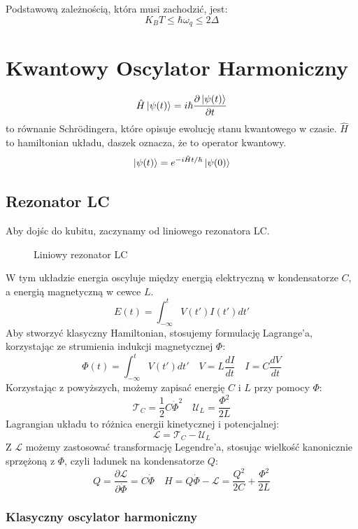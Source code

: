 \documentclass{../notatki}
\begin{document}
Podstawową zależnością, która musi zachodzić, jest:
$$
K_BT \leq \hbar \omega_q \leq 2 \Delta
$$

\section{Kwantowy Oscylator Harmoniczny}

$$
\hat{H} \ket{\psi(t)} = i \hbar \frac{\partial \ket{\psi(t)}}{\partial t}
$$
to równanie Schrödingera, które opisuje ewolucję stanu kwantowego w
czasie. $\hat{H}$ to hamiltonian układu, daszek oznacza, że to
operator kwantowy.
$$
\ket{\psi(t)} = e^{-i \hat{H} t / \hbar} \ket{\psi(0)}
$$

\subsection{Rezonator LC}

Aby dojśc do kubitu, zaczynamy od liniowego rezonatora LC.
\begin{figure}[h]
  \centering
  \caption{Liniowy rezonator LC}
\end{figure}
W tym układzie energia oscyluje między energią elektryczną w kondensatorze $C$,
a energią magnetyczną w cewce $L$.
$$
E(t) = \int_{-\infty}^t V(t') I(t') dt'
$$
Aby stworzyć klasyczny Hamiltonian, stosujemy formulację Lagrange'a,
korzystając ze strumienia indukcji magnetycznej $\Phi$:
$$
\Phi(t) = \int_{-\infty}^t V(t') dt' \quad V = L \frac{dI}{dt} \quad I
= C \frac{dV}{dt}
$$
Korzystając z powyższych, możemy zapisać energię $C$ i $L$ przy pomocy $\Phi$:
$$
\mathcal{T}_C = \frac{1}{2} C \dot{\Phi}^2 \quad \mathcal{U}_L =
\frac{\Phi^2}{2L}
$$
Lagrangian układu to różnica energii kinetycznej i potencjalnej:
$$
\mathcal{L} = \mathcal{T}_C - \mathcal{U}_L
$$
Z $\mathcal{L}$ możemy zastosować transformację Legendre'a, stosując
wielkość kanonicznie sprzężoną z $\Phi$, czyli ładunek na kondensatorze $Q$:
$$
Q = \frac{\partial \mathcal{L}}{\partial \dot{\Phi}} = C \dot{\Phi}
\quad H = Q \dot{\Phi} - \mathcal{L} = \frac{Q^2}{2C} + \frac{\Phi^2}{2L}
$$

\subsubsection{Klasyczny oscylator harmoniczny}
\end{document}
